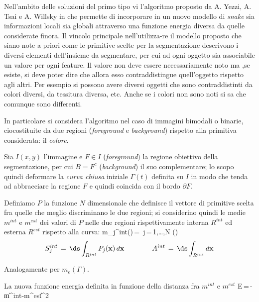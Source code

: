 Nell'ambito delle soluzioni del primo tipo vi \e l'algoritmo proposto da A. Yezzi, A. Tsai
e A. Willsky in \cite{Yezzi} che permette di incorporare in un nuovo modello di {\it snake}
sia informazioni locali sia globali attraverso una funzione energia diversa da quelle
considerate finora.
Il vincolo principale nell'utilizza-re il modello proposto \e che siano note a priori 
come le primitive scelte per la segmentazione descrivono i diversi elementi dell'insieme
da segmentare, per cui ad ogni oggetto sia associabile un valore per ogni feature.
\boss
Il valore non deve essere necessariamente noto ma ,se esiste, si deve poter dire che
allora esso contraddistingue quell'oggetto rispetto agli altri.
\eoss
Per esempio si possono avere diversi oggetti che sono contraddistinti da colori diversi,
da tessitura diversa, etc.
Anche se i colori non sono noti si sa che comunque sono differenti.

In particolare si considera l'algoritmo nel caso di immagini bimodali o
binarie, cio\e costituite da due regioni ({\it foreground} e {\it background}) rispetto alla
primitiva considerata: il {\it colore}.

\par
Sia $I(x,y)$ l'immagine e $F \in I$ ({\it foreground}) la regione obiettivo della 
segmentazione, per cui $B=F^c$ ({\it background}) \e il suo complementare; lo scopo
\e quindi deformare la {\it curva chiusa} iniziale $\Gamma (t)$ definita su $I$ in modo che
tenda ad abbracciare la regione $F$ e quindi coincida con
il bordo $\partial F$.

Definiamo $P$ la funzione $N$ dimensionale che definisce il vettore di primitive scelta fra
quelle che meglio discriminano le due regioni; si considerino quindi le medie $m^{int}$ e $m^{est}$
dei valori di $P$ nelle due regioni rispettivamente interna $R^{int}$ ed esterna $R^{est}$
rispetto alla curva:
\be
m_j^{int}(\Gamma)\,=\, \quad 
                     j\,=\,1,\dots,N \quad (\footnotemark)
\ee   
{}
$$
S_j^{int}\,=\,{\ds\int_{R^{int}}}\,P_j({\bf x})\,d{\bf x} \qquad\qquad
A^{int}\,=\,{\ds\int_{R^{int}}}\,d{\bf x}
$$

Analogamente per $m_e(\Gamma)$.

La nuova funzione energia \e definita in funzione della distanza fra $m^{int}$ e $m^{est}$
\be
{\cal E}\,=\,-\,\,\|m^{int}-m^{est}\|^2 
\ee

